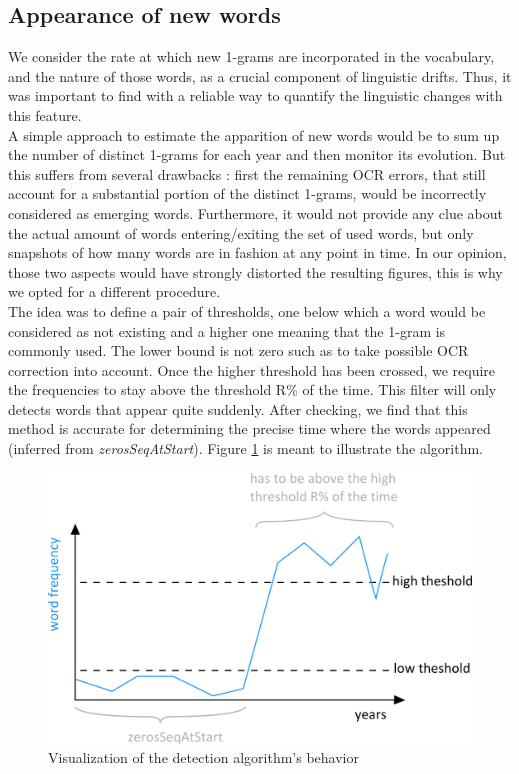 \subsection{Appearance of new words}

We consider the rate at which new 1-grams are incorporated in the vocabulary, and the nature of those words,  as a crucial component of linguistic drifts. Thus, it was important to find with a reliable way to quantify the linguistic changes with this feature.\\

A simple approach to estimate the apparition of new words would be to sum up the number of distinct 1-grams for each year and then monitor its evolution. But this suffers from several drawbacks : first the remaining OCR errors, that still account for a substantial portion of the distinct 1-grams,  would be incorrectly considered as emerging words.  Furthermore, it would not provide any clue about the actual amount of words entering/exiting the set of used words, but only snapshots of how many words are in fashion at any point in time. In our opinion, those two aspects would have strongly distorted the resulting figures, this is why we opted for a different procedure.\\

The idea was to define a pair of thresholds, one below which a word would be considered as not existing and a higher one meaning that the 1-gram is commonly used. The lower bound is not zero such as to take possible OCR correction into account. Once the higher threshold has been crossed, we require the frequencies to stay above the threshold R\% of the time.  This filter will only detects words that appear quite suddenly. After checking, we find that this method is accurate for determining the precise time where the words appeared (inferred from \textit{zerosSeqAtStart}). Figure \ref{algoschema} is meant to illustrate the algorithm.\\

\begin{figure}[h!]
        \includegraphics[scale=0.7]{Pictures/statistics/appearing-words/algo-schema.png}
        \caption{Visualization of the detection algorithm's behavior}
        \label{algoschema}
	\centering
\end{figure}

